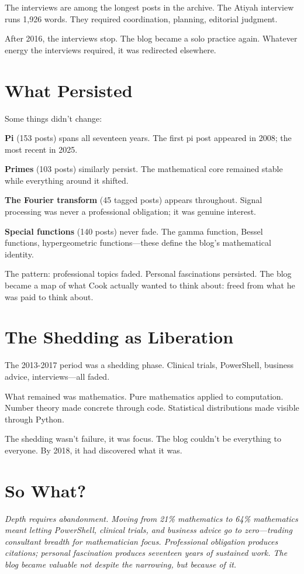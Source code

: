The interviews are among the longest posts in the archive. The Atiyah interview runs 1,926 words. They required coordination, planning, editorial judgment.

After 2016, the interviews stop. The blog became a solo practice again. Whatever energy the interviews required, it was redirected elsewhere.

\bigskip

\section*{What Persisted}

Some things didn't change:

\textbf{Pi} (153 posts) spans all seventeen years. The first pi post appeared in 2008; the most recent in 2025.

\textbf{Primes} (103 posts) similarly persist. The mathematical core remained stable while everything around it shifted.

\textbf{The Fourier transform} (45 tagged posts) appears throughout. Signal processing was never a professional obligation; it was genuine interest.

\textbf{Special functions} (140 posts) never fade. The gamma function, Bessel functions, hypergeometric functions---these define the blog's mathematical identity.

The pattern: professional topics faded. Personal fascinations persisted. The blog became a map of what Cook actually wanted to think about: freed from what he was paid to think about.

\bigskip

\section*{The Shedding as Liberation}

The 2013-2017 period was a shedding phase. Clinical trials, PowerShell, business advice, interviews---all faded.

What remained was mathematics. Pure mathematics applied to computation. Number theory made concrete through code. Statistical distributions made visible through Python.

The shedding wasn't failure, it was focus. The blog couldn't be everything to everyone. By 2018, it had discovered what it was.

\bigskip

\section*{So What?}

\textit{Depth requires abandonment. Moving from 21\% mathematics to 64\% mathematics meant letting PowerShell, clinical trials, and business advice go to zero—trading consultant breadth for mathematician focus. Professional obligation produces citations; personal fascination produces seventeen years of sustained work. The blog became valuable not despite the narrowing, but because of it.}
